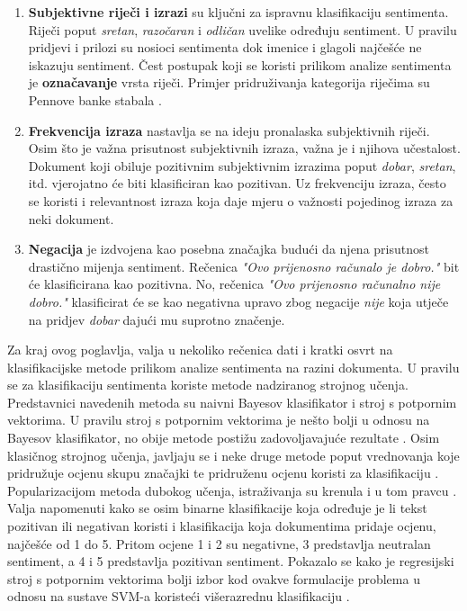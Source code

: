 \documentclass[times, utf8, zavrsni, numeric]{fer}
\begin{document}
\begin{enumerate}
  \item \textbf{Subjektivne riječi i izrazi} su ključni za ispravnu klasifikaciju sentimenta.
  Riječi poput \textit{sretan}, \textit{razočaran} i \textit{odličan} uvelike određuju sentiment.
  U pravilu pridjevi i prilozi su nosioci sentimenta dok imenice i glagoli najčešće ne iskazuju sentiment.
  Čest postupak koji se koristi prilikom analize sentimenta je \textbf{označavanje} vrsta riječi.
  Primjer pridruživanja kategorija riječima su Pennove banke stabala \cite{Marcus93buildinga}.

  \item \textbf{Frekvencija izraza} nastavlja se na ideju pronalaska subjektivnih riječi.
  Osim što je važna prisutnost subjektivnih izraza, važna je i njihova učestalost.
  Dokument koji obiluje pozitivnim subjektivnim izrazima poput \textit{dobar}, \textit{sretan}, 
  itd. vjerojatno će biti klasificiran kao pozitivan.
  Uz frekvenciju izraza, često se koristi i relevantnost izraza koja daje mjeru o važnosti pojedinog
  izraza za neki dokument.

  \item \textbf{Negacija} je izdvojena kao posebna značajka budući da njena prisutnost drastično mijenja 
  sentiment. Rečenica \textit{"Ovo prijenosno računalo je dobro."} bit će klasificirana kao pozitivna.
  No, rečenica \textit{"Ovo prijenosno računalno nije dobro."} klasificirat će se kao negativna upravo zbog
  negacije \textit{nije} koja utječe na pridjev \textit{dobar} dajući mu suprotno značenje. 
\end{enumerate}

\par Za kraj ovog poglavlja, valja u nekoliko rečenica dati i kratki osvrt na klasifikacijske metode
prilikom analize sentimenta na razini dokumenta. 
U pravilu se za klasifikaciju sentimenta koriste metode nadziranog strojnog učenja.
Predstavnici navedenih metoda su naivni Bayesov klasifikator i stroj s potpornim vektorima.
U pravilu stroj s potpornim vektorima je nešto bolji u odnosu na Bayesov klasifikator, no obije metode
postižu zadovoljavajuće rezultate \cite{Pang+Lee+Vaithyanathan:02a}.
Osim klasičnog strojnog učenja, javljaju se i neke druge metode poput vrednovanja koje pridružuje ocjenu 
skupu značajki te pridruženu ocjenu koristi za klasifikaciju \cite{Dave:2003:MPG:775152.775226}.
Popularizacijom metoda dubokog učenja, istraživanja su krenula i u tom pravcu \cite{Socher-etal:2013}.
Valja napomenuti kako se osim binarne klasifikacije koja određuje je li tekst pozitivan ili negativan 
koristi i klasifikacija koja dokumentima pridaje ocjenu, najčešće od 1 do 5. 
Pritom ocjene 1 i 2 su negativne, 3 predstavlja neutralan sentiment, a 4 i 5 predstavlja pozitivan 
sentiment. 
Pokazalo se kako je regresijski stroj s potpornim vektorima bolji izbor kod ovakve formulacije problema
u odnosu na sustave SVM-a koristeći višerazrednu klasifikaciju \cite{Pang:2005:SSE:1219840.1219855}.
\end{document}
